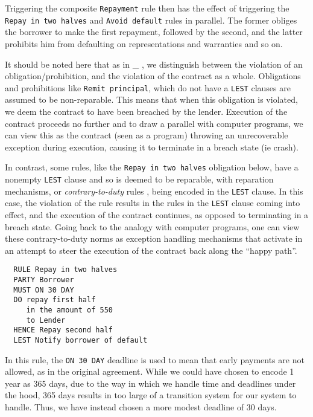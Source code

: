 \documentclass{article}
\begin{document}
Triggering the composite \texttt{Repayment} rule then has the effect of
triggering the \texttt{Repay in two halves} and \texttt{Avoid default}
rules in parallel.
The former obliges the borrower to make the first repayment, followed by the
second, and the latter prohibits him from defaulting on representations and
warranties and so on.

It should be noted here that as in \_
,
we distinguish between the violation of an obligation/prohibition, and the
violation of the contract as a whole.
Obligations and prohibitions like \texttt{Remit principal}, which do not have
a \texttt{LEST} clauses are assumed to be non-reparable.
This means that when this obligation is violated, we deem the contract to
have been breached by the lender.
Execution of the contract proceeds no further and to draw a parallel with
computer programs, we can view this as the contract (seen as a program)
throwing an unrecoverable exception during execution, causing it to terminate
in a breach state (ie crash).


In contrast, some rules, like the \texttt{Repay in two halves} obligation below,
have a nonempty \texttt{LEST} clause and so is deemed to be reparable, with
reparation mechanisms, or \textit{contrary-to-duty} rules
, being encoded in the
\texttt{LEST} clause.
In this case, the violation of the rule results in the rules in the
\texttt{LEST} clause coming into effect, and the execution of the contract
continues, as opposed to terminating in a breach state.
Going back to the analogy with computer programs, one can view these
contrary-to-duty norms as exception handling mechanisms that activate in an
attempt to steer the execution of the contract back along the ``happy path''.

\begin{lstlisting}
  RULE Repay in two halves
  PARTY	Borrower
  MUST ON 30 DAY
  DO repay first half
     in the amount of 550
     to Lender
  HENCE	Repay second half
  LEST Notify borrower of default
\end{lstlisting}

In this rule, the \texttt{ON 30 DAY} deadline is used to mean that early
payments are not allowed, as in the original agreement.
While we could have chosen to encode 1 year as 365 days, due to the way in which
we handle time and deadlines under the hood, 365 days results in too large of a
transition system for our system to handle.
Thus, we have instead chosen a more modest deadline of 30 days.
\end{document}
